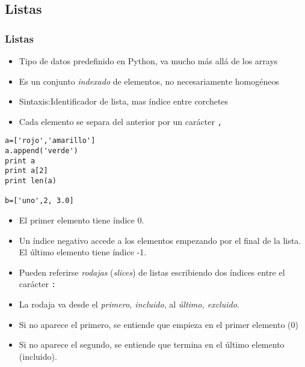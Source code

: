\documentclass[ucs]{beamer}
\begin{document}


\subsection{Listas}



\begin{frame}[fragile]
\frametitle{Listas}


\vspace{-6mm}
\begin{itemize}
\item Tipo de datos predefinido en Python, va mucho más allá de los
  arrays
\item Es un conjunto \emph{indexado} de elementos, no necesariamente homogéneos
\item Sintaxis:Identificador de lista, mas índice entre corchetes
\item Cada elemento se separa del anterior por un carácter \verb|,|
\end{itemize}
  \begin{scriptsize}
\begin{verbatim}
a=['rojo','amarillo']
a.append('verde')
print a
print a[2]
print len(a)

b=['uno',2, 3.0]

\end{verbatim}
  \end{scriptsize}

\end{frame}


\begin{frame}[fragile]

\begin{itemize}
\item El primer elemento tiene índice 0.
\item Un índice negativo accede a los elementos empezando por el final
  de la lista. El último elemento tiene índice -1.
\item Pueden referirse \emph{rodajas} (\emph{slices}) de listas
  escribiendo dos índices entre el carácter \verb|:|
\item La rodaja va desde el \emph{primero, incluido}, al \emph{último,
    excluido}.
\item Si no aparece el primero, se entiende que empieza en el primer
  elemento (0)
\item Si no aparece el segundo, se entiende que termina en el último
  elemento (incluido). 
\end{itemize}
\end{frame}
\end{document}
